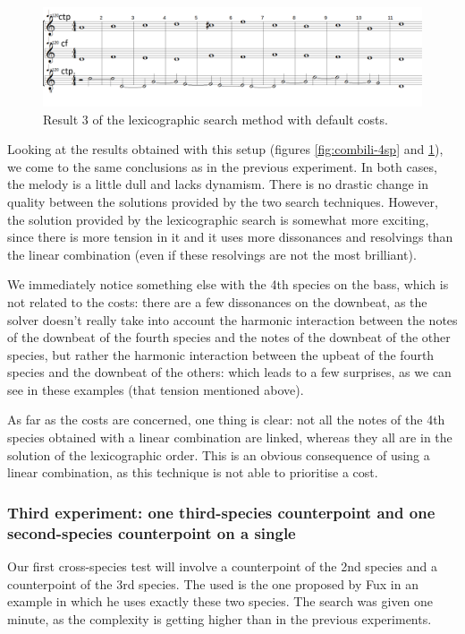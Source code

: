 \begin{figure}[h]
    \centering
    \includegraphics[width=1\textwidth]{Images/Experiments/basic-lexico-4sp.png}
    \caption{Result 3 of the lexicographic search method with default costs.}
    \label{fig:lexico-4sp}
\end{figure}
Looking at the results obtained with this setup (figures \ref{fig:combili-4sp} and \ref{fig:lexico-4sp}), we come to the same conclusions as in the previous experiment. 
In both cases, the melody is a little dull and lacks dynamism. There is no drastic change in quality between the solutions provided by the two search techniques. However, the solution provided by the lexicographic search is somewhat more exciting, since there is more tension in it and it uses more dissonances and resolvings than the linear combination (even if these resolvings are not the most brilliant).

We immediately notice something else with the 4th species on the bass, which is not related to the costs: there are a few dissonances on the downbeat, as the solver doesn't really take into account the harmonic interaction between the notes of the downbeat of the fourth species and the notes of the downbeat of the other species, but rather the harmonic interaction between the upbeat of the fourth species and the downbeat of the others: which leads to a few surprises, as we can see in these examples (that tension mentioned above).

As far as the costs are concerned, one thing is clear: not all the notes of the 4th species obtained with a linear combination are linked, whereas they all are in the solution of the lexicographic order. This is an obvious consequence of using a linear combination, as this technique is not able to prioritise a cost.


\subsubsection{Third experiment: one third-species counterpoint and one second-species counterpoint on a single \cf}
Our first cross-species test will involve a counterpoint of the 2nd species and a counterpoint of the 3rd species. The \cfs used is the one proposed by Fux in an example in which he uses exactly these two species. The search was given one minute, as the complexity is getting higher than in the previous experiments.


